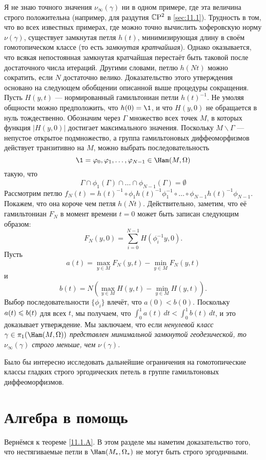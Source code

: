 Я не знаю точного значения $\nu_\infty (\gamma)$ ни в одном примере,
где эта величина строго положительна (например, для раздутия $\mathbb{C}\mathrm{P}^2$ в
\ref{sec:11.1}).
Трудность в том, что во всех известных примерах, где можно точно
вычислить хоферовскую норму $\nu(\gamma)$, существует замкнутая петля
$h(t)$, минимизирующая длину в своём гомотопическом классе (то есть
\emph{замкнутая кратчайшая}).
Однако оказывается, что всякая непостоянная замкнутая кратчайшая
перестаёт быть таковой после достаточного числа итераций.
Другими словами, петлю $h(Nt)$ можно сократить, если $N$ достаточно велико.
Доказательство этого утверждения основано на следующем обобщении
описанной выше процедуры сокращения.
Пусть $H(y, t)$ — нормированный гамильтониан петли $h(t)^{-1}$.
Не умоляя общности можно предположить, что $h(0) = \1$, и что $H(y,0)$
не обращается в нуль тождественно.
Обозначим через $\Gamma$ множество всех точек $M$, в которых функция
$|H(y, 0)|$ достигает максимального значения.
Поскольку $M \backslash \Gamma$ — непустое открытое подмножество, а
группа гамильтоновых диффеоморфизмов действует транзитивно на $M$,
можно выбрать последовательность
\[\1=\phi_0,\phi_1,\dots,\phi_{N-1}\in\Ham(M,\Omega)\]
такую, что 
\[\Gamma\cap\phi_1(\Gamma)\cap\dots\cap\phi_{N-1}(\Gamma)=\emptyset\]
Рассмотрим петлю $f_N(t) = h(t)^{-1} \circ \phi_1h(t)^{-1}\phi_1^{-1}
\circ \dots \circ \phi_{N-1}h(t)^{-1}\phi_{N-1}$.
Покажем, что она короче чем петля $h(Nt)$.
Действительно, заметим, что её гамильтониан $F_N$ в момент времени $t
= 0$ может быть записан следующим образом:
\[F_N(y,0) = \sum_{i=0}^{N-1} H(\phi_i^{-1}y, 0).\]
Пусть
\[a(t)
=
\max_{y\in M} F_N(y, t) - \min_{y\in M}  F_N(y, t)
\]
и
\[b(t)
=
N(\max_{y\in M} H(y, t) - \min_{y\in M}  H(y, t)).
\]
Выбор последовательности $\{\phi_i\}$ влечёт, что $a(0) < b(0)$.
Поскольку $a(t) \z\le b(t)$ для всех $t$, мы получаем, что
$\int_0^1a(t)\,dt < \int_0^1 b(t)\,dt$, и это доказывает утверждение.
Мы заключаем, что если \textit{ненулевой класс $\gamma\in
  \pi_1(\Ham(M, \Omega))$ представлен минимальной замкнутой
  геодезической, то $\nu_\infty (\gamma)$ строго меньше, чем
  $\nu(\gamma)$.}

Было бы интересно исследовать дальнейшие ограничения на гомотопические
классы гладких строго эргодических петель в группе гамильтоновых
диффеоморфизмов. 

\section{Алгебра в помощь}

Вернёмся к теореме \ref{11.1.A}.
В этом разделе мы наметим доказательство того, что нестягиваемые петли
в $\Ham(M_\ast, \Omega_\ast)$ не могут быть строго эргодичными.

